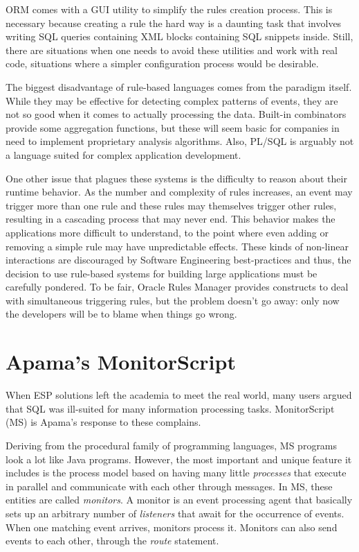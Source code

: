 \documentclass{report}
\begin{document}
ORM comes with a GUI utility to simplify the rules creation
process. This is necessary because creating a rule the hard way is a
daunting task that involves writing SQL queries containing XML blocks
containing SQL snippets inside. Still, there are situations when one
needs to avoid these utilities and work with real code, situations
where a simpler configuration process would be desirable.

The biggest disadvantage of rule-based languages comes from the
paradigm itself. While they may be effective for detecting complex
patterns of events, they are not so good when it comes to actually
processing the data. Built-in combinators provide some aggregation
functions, but these will seem basic for companies in need to
implement proprietary analysis algorithms. Also, PL/SQL is arguably
not a language suited for complex application development.

One other issue that plagues these systems is the difficulty to reason
about their runtime behavior. As the number and complexity of rules
increases, an event may trigger more than one rule and these rules may
themselves trigger other rules, resulting in a cascading process that
may never end. This behavior makes the applications more difficult to
understand, to the point where even adding or removing a simple rule
may have unpredictable effects. These kinds of non-linear interactions
are discouraged by Software Engineering best-practices and thus, the
decision to use rule-based systems for building large applications
must be carefully pondered. To be fair, Oracle Rules Manager provides
constructs to deal with simultaneous triggering rules, but the problem
doesn't go away: only now the developers will be to blame when things
go wrong.

\section{Apama's MonitorScript}

When ESP solutions left the academia to meet the real world, many
users argued that SQL was ill-suited for many information processing
tasks. MonitorScript (MS) is Apama's response to these complains.

Deriving from the procedural family of programming languages, MS
programs look a lot like Java programs. However, the most important
and unique feature it includes is the process model based on having
many little \emph{processes} that execute in parallel and communicate
with each other through messages. In MS, these entities are called
\emph{monitors}. A monitor is an event processing agent that basically
sets up an arbitrary number of \emph{listeners} that await for the
occurrence of events. When one matching event arrives, monitors
process it. Monitors can also send events to each other, through the
\emph{route} statement.
\end{document}
